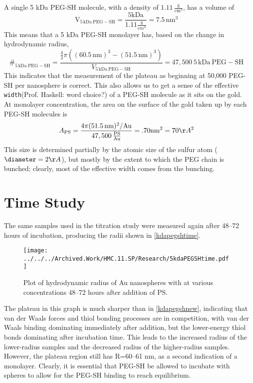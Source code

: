 A single 5 kDa PEG-SH molecule, with a density of $1.11\,\mathrm{\frac{g}{cm^3}}$, has a volume of \[\mathrm{V_{5\,kDa\ PEG-SH}}=\frac{5\mathrm{kDa}}{1.11\frac{\mathrm g}{\mathrm cm^3}}=7.5\mathrm{\,nm^3}\]
This means that a 5 kDa PEG-SH monolayer has, based on the change in hydrodynamic radius,
\[\#_{\mathrm{5\,kDa\ PEG-SH}}=\frac{\frac{4}{3}\pi((60.5\mathrm{\,nm})^3-(51.5\mathrm{\,nm})^3)}{V_{\mathrm{5\,kDa\ PEG-SH}}}=47,500\mathrm{\ 5\,kDa\ PEG-SH}\]
This indicates that the measurement of the plateau as beginning at 50,000 PEG-SH per nanosphere is correct. This also allows us to get a sense of the effective \texttt{width}(Prof. Haskell: word choice?) of a PEG-SH molecule as it sits on the gold. At monolayer concentration, the area on the surface of the gold taken up by each PEG-SH molecules is \[A_{\mathrm{PS}}=\frac{4\pi(51.5 \mathrm{\,nm})^2/\mathrm{Au}}{47,500\,\mathrm{\frac{PS}{Au}}}=.70\mathrm{nm}^2=70\AA^2\]
This size is determined partially by the atomic size of the sulfur atom ($\diameter=2\AA$), but mostly by the extent to which the PEG chain is bunched; clearly, most of the effective width comes from the bunching.

\section{Time Study}
\label{timestudy}

The same samples used in the titration study were measured again after 48--72 hours of incubation, producing the radii shown in \autoref{kdapegshtime}.

\begin{figure}[htbp]
\centering
\texttt{[image: ../../../Archived.Work/HMC.11.SP/Research/5kdaPEGSHtime.pdf]}
\caption{Plot of hydrodynamic radius of Au nanospheres with at various concentrations 48--72 hours after addition of PS.}
\label{kdapegshtime}
\end{figure}



The plateau in this graph is much sharper than in \autoref{kdapegshnew}, indicating that van der Waals forces and thiol bonding processes are in competition, with van der Waals binding dominating immediately after addition, but the lower-energy thiol bonds dominating after incubation time. This leads to the increased radius of the lower-radius samples and the decreased radius of the higher-radius samples. However, the plateau region still has R=60--61 nm, as a second indication of a monolayer. Clearly, it is essential that PEG-SH be allowed to incubate with spheres to allow for the PEG-SH binding to reach equilibrium.

